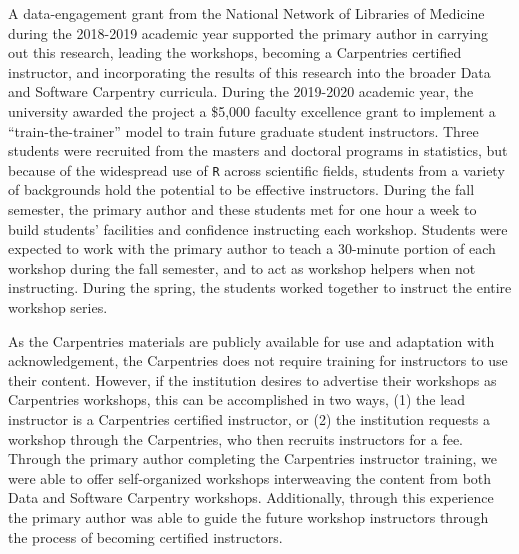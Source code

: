 \documentclass[12pt]{article}
\begin{document}
\quad A data-engagement grant from the National Network of Libraries of Medicine
during the 2018-2019 academic year supported the primary author in carrying out  
this research, leading the workshops, becoming a Carpentries certified
instructor, and incorporating the results of this research into the broader
Data and Software Carpentry curricula. During the 2019-2020 academic
year, the university awarded the project a \$5,000 faculty excellence grant to
implement a ``train-the-trainer'' model to train future graduate student
instructors. Three students were recruited from the masters and doctoral
programs in statistics, but because of the widespread use of \texttt{R} across
scientific fields, students from a variety of backgrounds hold the potential to
be effective instructors. During the fall semester, the primary author and these
students met for one hour a week to build students' facilities and confidence
instructing each workshop. Students were expected to work with the primary
author to teach a 30-minute portion of each workshop during the fall semester,
and to act as workshop helpers when not instructing. During the spring, the
students worked together to instruct the entire workshop series.  


\quad As the Carpentries materials are publicly available for use and 
adaptation with acknowledgement, the Carpentries does not require training for 
instructors to use their content. However, if the institution desires to 
advertise their workshops as Carpentries workshops, this can be accomplished in
two ways, (1) the lead instructor is a Carpentries certified instructor, or (2)
the institution requests a workshop through the Carpentries, who then recruits 
instructors for a fee. Through the primary author completing the Carpentries
instructor training, we were able to offer self-organized workshops interweaving 
the content from both Data and Software Carpentry workshops. Additionally, 
through this experience the primary author was able to guide the future 
workshop instructors through the process of becoming certified instructors. 
\end{document}
